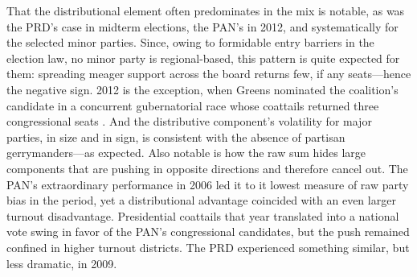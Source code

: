 \documentclass[letter,12pt]{article}
\begin{document}
That the distributional element often predominates in the mix is notable, as was the PRD's case in midterm elections, the PAN's in 2012, and systematically for the selected minor parties. Since, owing to formidable entry barriers in the election law, no minor party is regional-based, this pattern is quite expected for them: spreading meager support across the board returns few, if any seats---hence the negative sign. 2012 is the exception, when Greens nominated the coalition's candidate in a concurrent gubernatorial race whose coattails returned three congressional seats \citep{magar.gubCoatMx.2012}. And the distributive component's volatility for major parties, in size and in sign, is consistent with the absence of partisan gerrymanders---as expected. Also notable is how the raw sum hides large components that are pushing in opposite directions and therefore cancel out. The PAN's extraordinary performance in 2006 led it to it lowest measure of raw party bias in the period, yet a distributional advantage coincided with an even larger turnout disadvantage. Presidential coattails that year translated into a national vote swing in favor of the PAN's congressional candidates, but the push remained confined in higher turnout districts. The PRD experienced something similar, but less dramatic, in 2009. 
\end{document}
